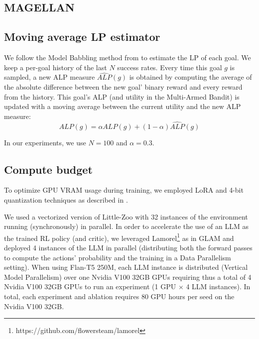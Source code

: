 \subsection{MAGELLAN}\label{app:magellan}

\subsection{Moving average LP estimator}\label{app:lp_estimator}
We follow the Model Babbling method from \cite{Forestier2016ModularAC} to estimate the LP of each goal.
We keep a per-goal history of the last $N$ success rates. Every time this goal $g$ is sampled, a new ALP measure $\hat{ALP}(g)$ is obtained by computing the average of the absolute difference between the new goal' binary reward and every reward from the history. This goal's ALP (and utility in the Multi-Armed Bandit) is updated with a moving average between the current utility and the new ALP measure:
\[
ALP(g) = \alpha ALP(g) + (1-\alpha) \hat{ALP}(g)
\]

In our experiments, we use $N=100$ and $\alpha=0.3$.

\subsection{Compute budget}
To optimize GPU VRAM usage during training, we employed LoRA \citep{Hu2021LoRALA} and 4-bit quantization techniques as described in \citep{Dettmers2023QLoRAEF}.

We used a vectorized version of Little-Zoo with 32 instances of the environment running (synchronously) in parallel. In order to accelerate the use of an LLM as the trained RL policy (and critic), we leveraged Lamorel\footnote{https://github.com/flowersteam/lamorel} as in GLAM and deployed 4 instances of the LLM in parallel (distributing both the forward passes to compute the actions' probability and the training in a Data Parallelism setting).
When using Flan-T5 250M, each LLM instance is distributed (Vertical Model Parallelism) over one Nvidia V100 32GB GPUs requiring thus a total of 4 Nvidia V100 32GB GPUs to run an experiment (1 GPU $\times$ 4 LLM instances). In total, each experiment and ablation requires 80 GPU hours per seed on the Nvidia V100 32GB.